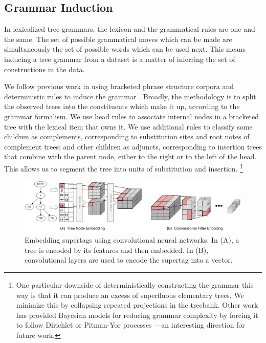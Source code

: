 \documentclass[11pt]{article}
\begin{document}
\subsection{Grammar Induction}

In lexicalized tree grammars, the lexicon and the grammatical rules
are one and the same.
%
The set of possible grammatical moves which can be made are simultaneously the set of possible words which can be used next.
%
This means inducing a tree grammar from a dataset is a matter of inferring the set of constructions in the data.


We follow previous work in using bracketed phrase structure corpora
and deterministic rules to induce the grammar
\cite{bangalore2001impact,chiang2000statistical}.
%
Broadly, the methodology is to split the observed trees into the
constituents which make it up, according to the grammar formalism.
%
We use head rules
\cite{chiang2000statistical,collins1997three,magerman1995statistical}
to associate internal nodes in a bracketed tree with the lexical item
that owns it.
%
We use additional rules to classify some children as complements,
corresponding to substitution sites and root notes of complement
trees; and other children as adjuncts, corresponding to insertion
trees that combine with the parent node, either to the right or to the
left of the head.  This allows us to segment the tree into units of
substitution and insertion.%
\footnote{One particular downside of deterministically constructing
  the grammar this way is that it can produce an excess of superfluous
  elementary trees.
%
We minimize this by collapsing repeated projections in the treebank.
%
Other work has provided Bayesian models for reducing grammar
complexity by forcing it to follow Dirichlet or Pitman-Yor processes
\cite{Cohn2010}---an interesting direction for future work.}



\begin{figure}[tH!]
\centering
\includegraphics[width=\textwidth]{spineembed.pdf}
\caption{Embedding supertags using convolutional neural networks. In (A), a tree is encoded by its features and then embedded.
 In (B), convolutional layers are used to encode the supertag into a vector.}
 \label{fig:spineembedding}
\end{figure}
\end{document}
